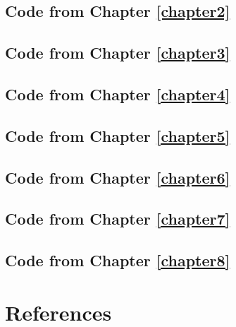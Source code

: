 \documentclass[11pt,twoside]{bristolthesis}
\begin{document}
\hypertarget{code-from-chapter-refchapter2}{%
\section{Code from Chapter \ref{chapter2}}\label{code-from-chapter-refchapter2}}

\hypertarget{code-from-chapter-refchapter3}{%
\section{Code from Chapter \ref{chapter3}}\label{code-from-chapter-refchapter3}}

\hypertarget{code-from-chapter-refchapter4}{%
\section{Code from Chapter \ref{chapter4}}\label{code-from-chapter-refchapter4}}

\hypertarget{code-from-chapter-refchapter5}{%
\section{Code from Chapter \ref{chapter5}}\label{code-from-chapter-refchapter5}}

\hypertarget{code-from-chapter-refchapter6}{%
\section{Code from Chapter \ref{chapter6}}\label{code-from-chapter-refchapter6}}

\hypertarget{code-from-chapter-refchapter7}{%
\section{Code from Chapter \ref{chapter7}}\label{code-from-chapter-refchapter7}}

\hypertarget{code-from-chapter-refchapter8}{%
\section{Code from Chapter \ref{chapter8}}\label{code-from-chapter-refchapter8}}

\backmatter

\hypertarget{references}{%
\chapter*{References}\label{references}}
\end{document}
